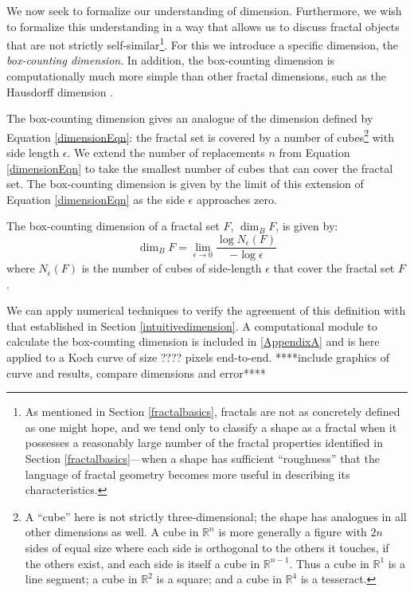 We now seek to formalize our understanding of dimension. Furthermore, we wish to formalize this understanding in a way that allows us to discuss fractal objects that are not strictly self-similar\footnote{As mentioned in Section \ref{fractalbasics}, fractals are not as concretely defined as one might hope, and we tend only to classify a shape as a fractal when it possesses a reasonably large number of the fractal properties identified in Section \ref{fractalbasics}---when a shape has sufficient ``roughness'' that the language of fractal geometry becomes more useful in describing its characteristics.}. For this we introduce a specific dimension, the \textit{box-counting dimension}. In addition, the box-counting dimension is computationally much more simple than other fractal dimensions, such as the Hausdorff dimension \citep{fractaltextbook}.

The box-counting dimension gives an analogue of the dimension defined by Equation \ref{dimensionEqn}: the fractal set is covered by a number of cubes\footnote{A ``cube'' here is not strictly three-dimensional; the shape has analogues in all other dimensions as well. A cube in $\mathbb{R}^n$ is more generally a figure with $2n$ sides of equal size where each side is orthogonal to the others it touches, if the others exist, and each side is itself a cube in $\mathbb{R}^{n-1}$. Thus a cube in $\mathbb{R}^1$ is a line segment; a cube in $\mathbb{R}^2$ is a square; and a cube in $\mathbb{R}^4$ is a tesseract.} with side length $\epsilon$. We extend the number of replacements $ n $ from Equation \ref{dimensionEqn} to take the smallest number of cubes that can cover the fractal set. The box-counting dimension is given by the limit of this extension of Equation \ref{dimensionEqn} as the side $\epsilon$ approaches zero.

\begin{mydef} The box-counting dimension of a fractal set $ F $, $\operatorname{dim}_B F $, is given by:
\begin{equation}\operatorname{dim}_B F = \lim_{\epsilon \to 0} \frac{\log N_\epsilon(F)}{-\log\epsilon}
\end{equation}
where $N_\epsilon(F)$ is the number of cubes of side-length $\epsilon$ that cover the fractal set $F$.
\end{mydef}

\begin{myexample} We can apply numerical techniques to verify the agreement of this definition with that established in Section \ref{intuitivedimension}. A computational module to calculate the box-counting dimension is included in \ref{AppendixA} and is here applied to a Koch curve of size ???? pixels end-to-end. ****include graphics of curve and results, compare dimensions and error****  \end{myexample}

